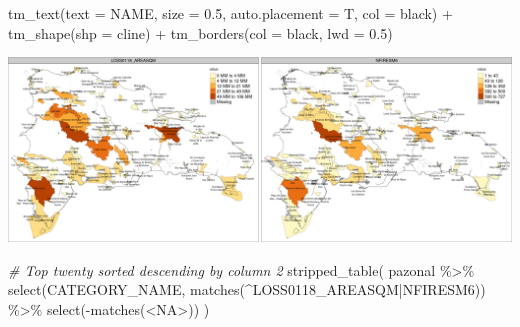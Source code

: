 \documentclass[10pt,landscape,a3paper]{article}
\newenvironment{Shaded}{\begin{snugshade}}{\end{snugshade}}
\newcommand{\AttributeTok}[1]{\textcolor[rgb]{0.77,0.63,0.00}{#1}}
\newcommand{\CommentTok}[1]{\textcolor[rgb]{0.56,0.35,0.01}{\textit{#1}}}
\newcommand{\FloatTok}[1]{\textcolor[rgb]{0.00,0.00,0.81}{#1}}
\newcommand{\FunctionTok}[1]{\textcolor[rgb]{0.00,0.00,0.00}{#1}}
\newcommand{\NormalTok}[1]{#1}
\newcommand{\SpecialCharTok}[1]{\textcolor[rgb]{0.00,0.00,0.00}{#1}}
\newcommand{\StringTok}[1]{\textcolor[rgb]{0.31,0.60,0.02}{#1}}
\begin{document}
\begin{Shaded}
\begin{Highlighting}[]
  \FunctionTok{tm\_text}\NormalTok{(}\AttributeTok{text =} \StringTok{\textquotesingle{}NAME\textquotesingle{}}\NormalTok{, }\AttributeTok{size =} \FloatTok{0.5}\NormalTok{, }\AttributeTok{auto.placement =}\NormalTok{ T, }\AttributeTok{col =} \StringTok{\textquotesingle{}black\textquotesingle{}}\NormalTok{) }\SpecialCharTok{+} 
  \FunctionTok{tm\_shape}\NormalTok{(}\AttributeTok{shp =}\NormalTok{ cline) }\SpecialCharTok{+} \FunctionTok{tm\_borders}\NormalTok{(}\AttributeTok{col =} \StringTok{\textquotesingle{}black\textquotesingle{}}\NormalTok{, }\AttributeTok{lwd =} \FloatTok{0.5}\NormalTok{)}
\end{Highlighting}
\end{Shaded}

\begin{center}\includegraphics{img/data-download-preparation-eda/zonal-pa-9} \end{center}

\begin{Shaded}
\begin{Highlighting}[]
\CommentTok{\# Top twenty sorted descending by column 2}
\FunctionTok{stripped\_table}\NormalTok{(}
\NormalTok{  pazonal }\SpecialCharTok{\%\textgreater{}\%} \FunctionTok{select}\NormalTok{(CATEGORY\_NAME, }\FunctionTok{matches}\NormalTok{(}\StringTok{\textquotesingle{}\^{}LOSS0118\_AREASQM|NFIRESM6\textquotesingle{}}\NormalTok{)) }\SpecialCharTok{\%\textgreater{}\%}
    \FunctionTok{select}\NormalTok{(}\SpecialCharTok{{-}}\FunctionTok{matches}\NormalTok{(}\StringTok{\textquotesingle{}\textless{}NA\textgreater{}\textquotesingle{}}\NormalTok{))}
\NormalTok{)}
\end{Highlighting}
\end{Shaded}
\end{document}

